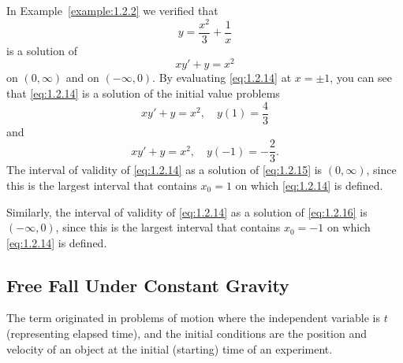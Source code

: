 \documentclass{ximera}
\begin{document}
\begin{example}\label{example:1.2.7}
In Example~\ref{example:1.2.2} we verified that
\begin{equation} \label{eq:1.2.14}
y=\frac{x^2}{3}+\frac{1}{x}
\end{equation}
is a solution of
$$
xy'+y=x^2
$$
on $(0,\infty)$ and on $(-\infty,0)$. By evaluating \eqref{eq:1.2.14} at
$x=\pm 1$, you can see that \eqref{eq:1.2.14} is a solution of the initial
value problems
\begin{equation} \label{eq:1.2.15}
xy'+y=x^2,\quad y(1)=\frac{4}{3}
\end{equation}
and
\begin{equation} \label{eq:1.2.16}
xy'+y=x^2,\quad y(-1)=-\frac{2}{3}.
\end{equation}
The interval of validity of \eqref{eq:1.2.14} as a solution of
\eqref{eq:1.2.15} is $(0,\infty)$, since this is the largest interval
that contains $x_0=1$ on which \eqref{eq:1.2.14} is defined.
 
 
Similarly, the
interval of validity of \eqref{eq:1.2.14} as a solution of \eqref{eq:1.2.16}
is $(-\infty,0)$, since this is the largest interval that contains
$x_0=-1$ on which \eqref{eq:1.2.14} is defined.
 
 
\end{example}
 
\subsection*{Free Fall Under Constant Gravity}
 
The term   originated in problems
of motion where the independent variable is $t$
(representing elapsed time), and the initial conditions
are the position and velocity of an object at the initial
(starting) time of an experiment.
 
\end{document}
